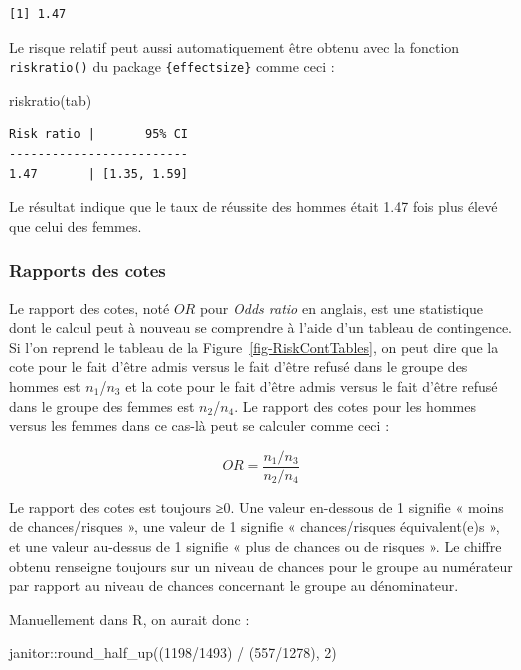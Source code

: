 \documentclass[
  letterpaper,
]{book}
\newenvironment{Shaded}{\begin{snugshade}}{\end{snugshade}}
\newcommand{\DecValTok}[1]{\textcolor[rgb]{0.68,0.00,0.00}{#1}}
\newcommand{\FunctionTok}[1]{\textcolor[rgb]{0.28,0.35,0.67}{#1}}
\newcommand{\NormalTok}[1]{\textcolor[rgb]{0.00,0.23,0.31}{#1}}
\newcommand{\SpecialCharTok}[1]{\textcolor[rgb]{0.37,0.37,0.37}{#1}}
\begin{document}
\begin{verbatim}
[1] 1.47
\end{verbatim}

Le risque relatif peut aussi automatiquement être obtenu avec la
fonction \texttt{riskratio()} du package \texttt{\{effectsize\}} comme
ceci :

\begin{Shaded}
\begin{Highlighting}[]
\FunctionTok{riskratio}\NormalTok{(tab)}
\end{Highlighting}
\end{Shaded}

\begin{verbatim}
Risk ratio |       95% CI
-------------------------
1.47       | [1.35, 1.59]
\end{verbatim}

Le résultat indique que le taux de réussite des hommes était 1.47 fois
plus élevé que celui des femmes.

\subsubsection{Rapports des cotes}\label{rapports-des-cotes}

Le rapport des cotes, noté \(OR\) pour \emph{Odds ratio} en anglais, est
une statistique dont le calcul peut à nouveau se comprendre à l'aide
d'un tableau de contingence. Si l'on reprend le tableau de la
Figure~\ref{fig-RiskContTables}, on peut dire que la cote pour le fait
d'être admis versus le fait d'être refusé dans le groupe des hommes est
\(n_{1}\)/\(n_{3}\) et la cote pour le fait d'être admis versus le fait
d'être refusé dans le groupe des femmes est \(n_{2}\)/\(n_{4}\). Le
rapport des cotes pour les hommes versus les femmes dans ce cas-là peut
se calculer comme ceci :

\[ OR =  \frac{n_{1} / n{_{3}}}{n_{2} / n{_{4}}}\]

Le rapport des cotes est toujours ≥0. Une valeur en-dessous de 1
signifie « moins de chances/risques », une valeur de 1 signifie «
chances/risques équivalent(e)s », et une valeur au-dessus de 1 signifie
« plus de chances ou de risques ». Le chiffre obtenu renseigne toujours
sur un niveau de chances pour le groupe au numérateur par rapport au
niveau de chances concernant le groupe au dénominateur.

Manuellement dans R, on aurait donc :

\begin{Shaded}
\begin{Highlighting}[]
\NormalTok{janitor}\SpecialCharTok{::}\FunctionTok{round\_half\_up}\NormalTok{((}\DecValTok{1198}\SpecialCharTok{/}\DecValTok{1493}\NormalTok{) }\SpecialCharTok{/}\NormalTok{ (}\DecValTok{557}\SpecialCharTok{/}\DecValTok{1278}\NormalTok{), }\DecValTok{2}\NormalTok{)}
\end{Highlighting}
\end{Shaded}
\end{document}
